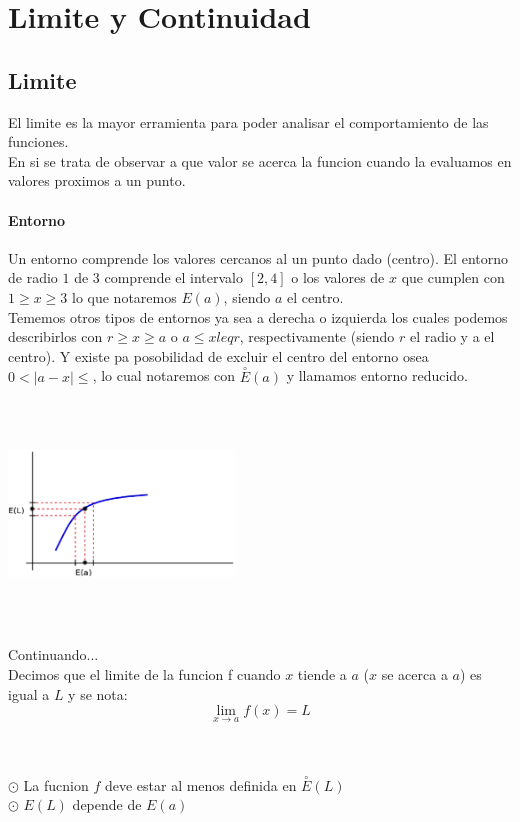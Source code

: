 \chapter{Limite y Continuidad}
\section{Limite}

El limite es la mayor erramienta para poder analisar el comportamiento de las funciones. \\
En si se trata de observar a que valor se acerca la funcion cuando la evaluamos en valores proximos a un punto.
\subsubsection{Entorno}
Un entorno comprende los valores cercanos al un punto dado (centro). El entorno de radio $1$ de $3$ comprende el intervalo $[2,4]$ o los valores de $x$ que cumplen con $1 \geq x \geq 3$ lo que notaremos $E(a)$, siendo $a$ el centro.\\
Tememos otros tipos de entornos ya sea a derecha o izquierda los cuales podemos describirlos con $r \geq x \geq a$ o $a \leq x leq r$, respectivamente (siendo $r$ el radio y a el centro). Y existe pa posobilidad de excluir el centro del entorno osea $ 0<|a-x|\leq$, lo cual notaremos con  $\stackrel{\circ}{E} (a)$ y llamamos entorno reducido.\\
\hfill
\begin{minipage}{.45\textwidth}
\begin{center}
\includegraphics[height=6cm,width=6cm]{limite01.eps}
\end{center} 
\end{minipage}
\begin{minipage}{.50\textwidth}
Continuando...\\

Decimos que el limite de la funcion f cuando $x$ tiende a $a$ ($x$ se acerca a $a$) es igual a $L$ y se nota:
	$$ \lim_{x \rightarrow a}{f(x)} = L $$
\end{minipage}
\hfill \\\\
$\odot$ La fucnion $f$ deve estar al menos definida en $\stackrel{\circ}{E}(L)$\\
$\odot$ $E(L)$ depende de $E(a)$\\

